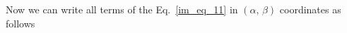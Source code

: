 \documentclass[11pt,a4paper,oneside]{book}
\numberwithin{equation}{section}
\theoremstyle{it}
\theoremstyle{definition}
\begin{document}
Now we can write all terms of the Eq.~\eqref{im_eq_11} in $(\alpha,\,\beta)$ 
coordinates as follows
\end{document}
